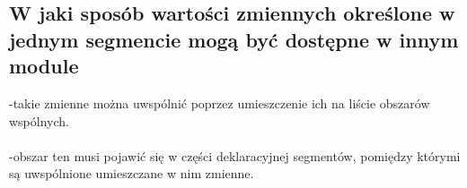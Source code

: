 \subsection{W jaki sposób wartości zmiennych określone w jednym segmencie mogą być dostępne w innym module}

-takie zmienne można uwspólnić poprzez umieszczenie ich na liście obszarów wspólnych.
\\
\\
-obszar ten musi pojawić się w części deklaracyjnej segmentów, pomiędzy którymi są uwspólnione umieszczane w nim zmienne.